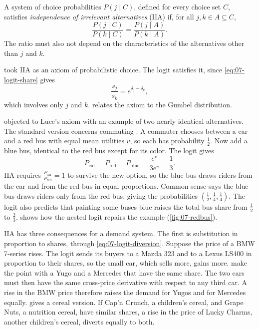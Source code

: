 \begin{definition}[IIA]\label{def:07-iia}
A system of choice probabilities $P(j \mid C)$, defined for every choice set $C$, satisfies
\emph{independence of irrelevant alternatives} (IIA) if, for all $j, k \in A \subseteq C$,
\begin{equation*}
  \frac{P(j \mid C)}{P(k \mid C)} = \frac{P(j \mid A)}{P(k \mid A)} .
\end{equation*}
The ratio must also not depend on the characteristics of the alternatives other than $j$ and $k$.
\end{definition}

\citet{Luce1959} took IIA as an axiom of probabilistic choice. The logit satisfies it, since
\eqref{eq:07-logit-share} gives
\begin{equation}\label{eq:07-logit-iia}
  \frac{s_j}{s_k} = e^{\delta_j - \delta_k},
\end{equation}
which involves only $j$ and $k$.  relates the axiom to the Gumbel distribution.

\citet{Debreu1960} objected to Luce's axiom with an example of two nearly identical alternatives. The standard
version concerns commuting \citep[Section~3.3.2, p.~46]{Train2009}.
A commuter chooses between a car and a red bus with
equal mean utilities $v$, so each has probability $\frac{1}{2}$. Now add a blue bus, identical to the red bus
except for its color. The logit gives
\begin{equation*}
  P_{\text{car}} = P_{\text{red}} = P_{\text{blue}} = \frac{e^{v}}{3e^{v}} = \frac{1}{3} .
\end{equation*}
IIA requires $\frac{P_{\text{car}}}{P_{\text{red}}} = 1$ to survive the new option, so the blue bus draws riders
from the car and from the red bus in equal proportions. Common sense says the blue bus draws riders only from
the red bus, giving the probabilities $(\frac{1}{2}, \frac{1}{4}, \frac{1}{4})$. The logit also predicts
that painting some buses blue raises the total bus share from $\frac{1}{2}$ to $\frac{2}{3}$.
 shows how the nested logit repairs the example (\cref{fig:07-redbus}).

IIA has three consequences for a demand system. The first is substitution in proportion to shares, through
\eqref{eq:07-logit-diversion}. Suppose the price of a BMW 7-series rises. The logit sends its buyers to a Mazda
323 and to a Lexus LS400 in proportion to their shares, so the small car, which sells more, gains more.
\citet[p.~847]{BerryLevinsohnPakes1995} make the point with a Yugo and a Mercedes that have the same share.
The two cars must then have the same cross-price derivative with respect to any third car. A rise in the BMW
price therefore raises the demand for Yugos and for Mercedes equally. \citet[p.~523]{Nevo2000a} gives a cereal
version. If Cap'n Crunch, a children's cereal, and Grape Nuts, a nutrition cereal, have similar shares, a rise
in the price of Lucky Charms, another children's cereal, diverts equally to both.

